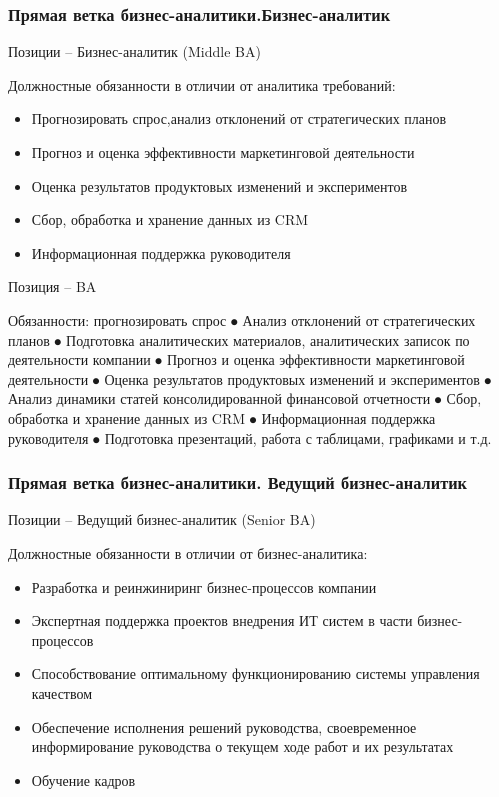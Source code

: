 \documentclass{../industrial-development}
\begin{document}
\begin{frame} \frametitle{Прямая ветка бизнес-аналитики.Бизнес-аналитик}
  \begin{block}{}
  \alert{Позиции – Бизнес-аналитик (Middle  BA) }

Должностные обязанности в отличии от аналитика требований: 
  \end{block}
  \begin{itemize}
  \item  Прогнозировать спрос,анализ отклонений от стратегических планов
  \item   Прогноз и оценка эффективности маркетинговой деятельности
  \item Оценка результатов продуктовых изменений и экспериментов
 \item  Сбор, обработка и хранение данных из CRM
 \item  Информационная поддержка руководителя
  \end{itemize}
\end{frame}


\lecturenotes
Позиция –  BA

Обязанности:
	прогнозировать спрос 
⦁ Анализ отклонений от стратегических планов
⦁ Подготовка аналитических материалов, аналитических записок по деятельности компании
⦁ Прогноз и оценка эффективности маркетинговой деятельности
⦁ Оценка результатов продуктовых изменений и экспериментов
⦁ Анализ динамики статей консолидированной финансовой отчетности
⦁ Сбор, обработка и хранение данных из CRM
⦁ Информационная поддержка руководителя
⦁ Подготовка презентаций, работа с таблицами, графиками и т.д.


\begin{frame} \frametitle{Прямая ветка бизнес-аналитики. Ведущий бизнес-аналитик}
  \begin{block}{}
  \alert{Позиции – Ведущий бизнес-аналитик (Senior  BA) }

Должностные обязанности в отличии от бизнес-аналитика: 
  \end{block}
  \begin{itemize}
  \item  Разработка и реинжиниринг бизнес-процессов компании
  \item   Экспертная поддержка проектов внедрения ИТ систем в части бизнес-процессов
  \item Способствование оптимальному функционированию системы управления качеством
 \item  Обеспечение исполнения решений руководства, своевременное информирование руководства о текущем ходе работ и их результатах
 \item  Обучение кадров
  \end{itemize}
\end{frame}
\end{document}

